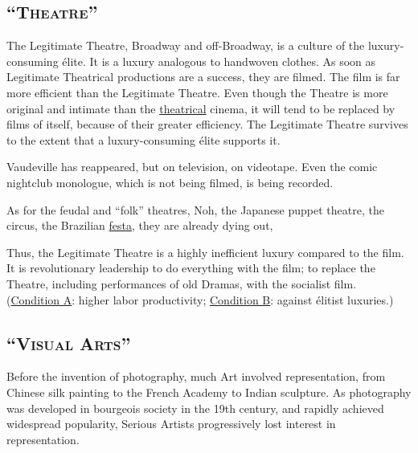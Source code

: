 
\subsection*{\enquote{\textsc{Theatre}}}
The Legitimate Theatre, Broadway and off-Broadway, is a culture of the luxury-consuming \'{e}lite. It is a luxury analogous to handwoven clothes. As soon as Legitimate Theatrical productions are a success, they are filmed. The film is far more efficient than the Legitimate Theatre. Even though the Theatre is more original and intimate than the \uline{theatrical} cinema, it will tend to be replaced by films of itself, because of their greater efficiency. The Legitimate Theatre survives to the extent that a luxury-consuming \'{e}lite supports it. 

Vaudeville has reappeared, but on television, on videotape. Even the comic nightclub monologue, which is not being filmed, is being recorded. 

As for the feudal and \enquote{folk} theatres, Noh, the Japanese puppet theatre, the circus, the Brazilian \uline{festa}, they are already dying out, 

Thus, the Legitimate Theatre is a highly inefficient luxury compared to the film. It is revolutionary leadership to do everything with the film; to replace the Theatre, including performances of old Dramas, with the socialist film. (\uline{Condition A}: higher labor productivity; \uline{Condition B}: against \'{e}litist luxuries.) 

\subsection*{\enquote{\textsc{Visual Arts}}}
Before the invention of photography, much Art involved representation, from Chinese silk painting to the French Academy to Indian sculpture. As photography was developed in bourgeois society in the 19th century, and rapidly achieved widespread popularity, Serious Artists progressively lost interest in representation. 

